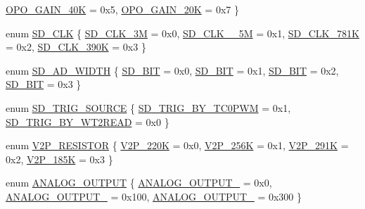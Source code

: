 \begin{DoxyCompactItemize}
\mbox{\hyperlink{a00002_a6424f6db97a2e691b73af9c4053f1650adbde1c86d4a091e298c72418f7ccf5eb}{O\+P\+O\+\_\+\+G\+A\+I\+N\+\_\+40K}} = 0x5, 
\mbox{\hyperlink{a00002_a6424f6db97a2e691b73af9c4053f1650a44bf632448f2bed40aad8456d4ab211e}{O\+P\+O\+\_\+\+G\+A\+I\+N\+\_\+20K}} = 0x7
 \}
\item 
enum \mbox{\hyperlink{a00002_aebc3424fa91b715741f0320561ecfbb0}{S\+D\+\_\+\+C\+LK}} \{ \mbox{\hyperlink{a00002_aebc3424fa91b715741f0320561ecfbb0a720c5991be73063f5ab035440f26b486}{S\+D\+\_\+\+C\+L\+K\+\_\+3M}} = 0x0, 
\mbox{\hyperlink{a00002_aebc3424fa91b715741f0320561ecfbb0a5241c8457df3f987f10797b36db20771}{S\+D\+\_\+\+C\+L\+K\+\_\+\_\+5M}} = 0x1, 
\mbox{\hyperlink{a00002_aebc3424fa91b715741f0320561ecfbb0a37bbada3115f676b49cc087c5caac0d3}{S\+D\+\_\+\+C\+L\+K\+\_\+781K}} = 0x2, 
\mbox{\hyperlink{a00002_aebc3424fa91b715741f0320561ecfbb0ace583ebd6e97c856a883187711ea4226}{S\+D\+\_\+\+C\+L\+K\+\_\+390K}} = 0x3
 \}
\item 
enum \mbox{\hyperlink{a00002_a44030e617a742aba101c6dcd3ec2078e}{S\+D\+\_\+\+A\+D\+\_\+\+W\+I\+D\+TH}} \{ \mbox{\hyperlink{a00002_a44030e617a742aba101c6dcd3ec2078ea9c86002a4a99d0d440bca9b7f8d2ec93}{S\+D\+\_\+B\+IT}} = 0x0, 
\mbox{\hyperlink{a00002_a44030e617a742aba101c6dcd3ec2078ea43562124882d2ecf1ce1b062c46e035c}{S\+D\+\_\+B\+IT}} = 0x1, 
\mbox{\hyperlink{a00002_a44030e617a742aba101c6dcd3ec2078eacac5c6814a8f28e35ebeef99751a9d5f}{S\+D\+\_\+B\+IT}} = 0x2, 
\mbox{\hyperlink{a00002_a44030e617a742aba101c6dcd3ec2078ea3a9f3242e2567dcfb29f566e45cf6de0}{S\+D\+\_\+B\+IT}} = 0x3
 \}
\item 
enum \mbox{\hyperlink{a00002_ab266bb772aaf5cffad6bede99cfb094c}{S\+D\+\_\+\+T\+R\+I\+G\+\_\+\+S\+O\+U\+R\+CE}} \{ \mbox{\hyperlink{a00002_ab266bb772aaf5cffad6bede99cfb094ca2da9ae6568d907b90ab68f56f8605ada}{S\+D\+\_\+\+T\+R\+I\+G\+\_\+\+B\+Y\+\_\+\+T\+C0\+P\+WM}} = 0x1, 
\mbox{\hyperlink{a00002_ab266bb772aaf5cffad6bede99cfb094ca9596adcc3a82f8e983e664a6ed5144a6}{S\+D\+\_\+\+T\+R\+I\+G\+\_\+\+B\+Y\+\_\+\+W\+T2\+R\+E\+AD}} = 0x0
 \}
\item 
enum \mbox{\hyperlink{a00002_a80255c41c3764feff9b79664f15feb46}{V2\+P\+\_\+\+R\+E\+S\+I\+S\+T\+OR}} \{ \mbox{\hyperlink{a00002_a80255c41c3764feff9b79664f15feb46a1ac9774056594cac22ae2c6431fa4277}{V2\+P\+\_\+220K}} = 0x0, 
\mbox{\hyperlink{a00002_a80255c41c3764feff9b79664f15feb46a4b7eb698a06cc149cbb1b7f8f4dd4a8e}{V2\+P\+\_\+256K}} = 0x1, 
\mbox{\hyperlink{a00002_a80255c41c3764feff9b79664f15feb46ae20e5b8adb1fa31fa8df9a56d05e7eb5}{V2\+P\+\_\+291K}} = 0x2, 
\mbox{\hyperlink{a00002_a80255c41c3764feff9b79664f15feb46aa035ba8725fe8565c5505a295c22ea8e}{V2\+P\+\_\+185K}} = 0x3
 \}
\item 
enum \mbox{\hyperlink{a00002_a4d490931c48f5330b52533397251335c}{A\+N\+A\+L\+O\+G\+\_\+\+O\+U\+T\+P\+UT}} \{ \mbox{\hyperlink{a00002_a4d490931c48f5330b52533397251335cacddac909ab33947534e48dd4db264d74}{A\+N\+A\+L\+O\+G\+\_\+\+O\+U\+T\+P\+U\+T\+\_}} = 0x0, 
\mbox{\hyperlink{a00002_a4d490931c48f5330b52533397251335cae3e86cb61e54d2d71a936d57768b2c04}{A\+N\+A\+L\+O\+G\+\_\+\+O\+U\+T\+P\+U\+T\+\_}} = 0x100, 
\mbox{\hyperlink{a00002_a4d490931c48f5330b52533397251335ca778485bb7dac9a00dadf2d72aa1606e1}{A\+N\+A\+L\+O\+G\+\_\+\+O\+U\+T\+P\+U\+T\+\_}} = 0x300
 \}
\end{DoxyCompactItemize}
